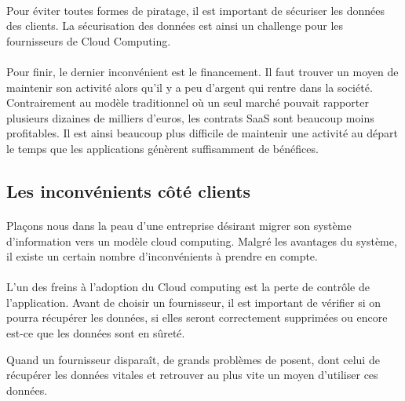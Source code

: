 \documentclass[a4paper,12pt]{report}
\begin{document}
\begin{onehalfspace}
	\paragraph*{}
	Pour éviter toutes formes de piratage, il est important de sécuriser les données des clients. La sécurisation des données est ainsi un challenge pour les fournisseurs de Cloud Computing. 
	
	\paragraph*{}
	Pour finir, le dernier inconvénient est le financement. Il faut trouver un moyen de maintenir son activité alors qu'il y a peu d'argent qui rentre dans la société. Contrairement au modèle traditionnel où un seul marché pouvait rapporter plusieurs dizaines de milliers d'euros, les contrats SaaS sont beaucoup moins profitables. Il est ainsi beaucoup plus difficile de maintenir une activité au départ le temps que les applications génèrent suffisamment de bénéfices.
	
	
	
	
	
	\subsection{Les inconvénients côté clients}
	

	\paragraph*{}	
	Plaçons nous dans la peau d'une entreprise désirant migrer son système d'information vers un modèle cloud computing. Malgré les avantages du système, il existe un certain nombre d'inconvénients à prendre en compte.
	
	\paragraph*{}
	L'un des freins à l'adoption du Cloud computing est	la perte de contrôle de l'application. Avant de choisir un fournisseur, il est important de vérifier si on pourra récupérer les données, si elles seront correctement supprimées ou encore est-ce que les données sont en sûreté.
	
	Quand un fournisseur disparaît, de grands problèmes de posent, dont celui de récupérer les données vitales et retrouver au plus vite un moyen d'utiliser ces données.
		 

\end{onehalfspace}
\end{document}
